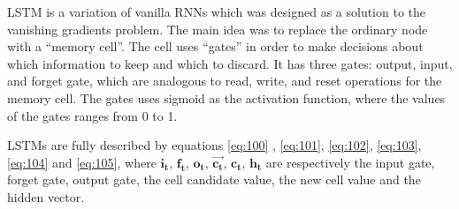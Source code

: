 \ac{LSTM} \cite{hochreiter1997long} is a variation of vanilla \ac{RNN}s which was designed as a solution to the vanishing gradients problem. The main idea was to replace the ordinary node with a \enquote{memory cell}. The cell uses \enquote{gates} in order to make decisions about which information to keep and which to discard. It has three gates: output, input, and forget gate, which are analogous to read, write, and reset operations for the memory cell. The gates uses sigmoid as the activation function, where the values of the gates ranges from 0 to 1.

\ac{LSTM}s are fully described by equations \ref{eq:100} , \ref{eq:101}, \ref{eq:102}, \ref{eq:103}, \ref{eq:104} and \ref{eq:105}, where $\mathbf{i_t}$, $\mathbf{f_t}$, $\mathbf{o_t}$, $\mathbf{\vec{c_t}}$, $\mathbf{c_t}$, $\mathbf{h_t}$ are respectively the input gate, forget gate, output gate, the cell candidate value, the new cell value and the hidden vector. 











